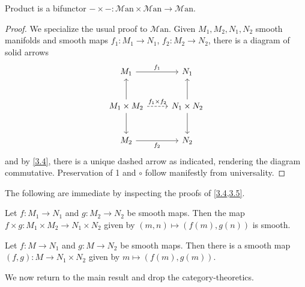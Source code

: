 \documentclass[11pt, letterpaper]{article}
\theoremstyle{theorem}
\begin{document}
\begin{corollary}\label{3.5}
	Product is a bifunctor $-\times - : \mathcal{M} \mathrm{an} \times \mathcal{M} \mathrm{an}  \to \mathcal{M} \mathrm{an} $.
\end{corollary}
\begin{proof}
	We specialize the usual proof to $\mathcal{M} \mathrm{an} $. Given $M_1,M_2,N_1,N_2$ smooth manifolds and smooth maps $f_1 : M_1 \to N_1$, $f_2 : M_2 \to N_2$, there is a diagram of solid arrows
	\[\begin{tikzcd}[row sep = 2.5em, column sep = 2.5em]
	M_1 \ar[" f_1 ", r]  & N_1 \\
	M_1\times M_2 \ar[u] \ar[" f_1\times f_2 ", dashed, r] \ar[d]  & N_1\times N_2\ar[u] \ar[d]  \\
	M_2\ar[" f_2 "', r]  & N_2
	\end{tikzcd}\]
	and by \cref{3.4}, there is a unique dashed arrow as indicated, rendering the diagram commutative. Preservation of 1 and $\circ $ follow manifestly from universality.
\end{proof}

The following are immediate by inspecting the proofs of \cref{3.4,3.5}.
\begin{corollary}\label{3.6}
	Let $f : M_1 \to N_1$ and $g : M_2 \to N_2$ be smooth maps. Then the map $f\times g : M_1\times M_2 \to N_1\times N_2$ given by $(m,n)\mapsto (f(m),g(n))$ is smooth.
\end{corollary}
\begin{corollary}\label{3.7}
	Let $f : M \to N_1$ and $g : M \to N_2$ be smooth maps. Then there is a smooth map $(f,g): M \to N_1\times N_2$ given by $m\mapsto (f(m),g(m))$.
\end{corollary}

We now return to the main result and drop the category-theoretics.
\end{document}
